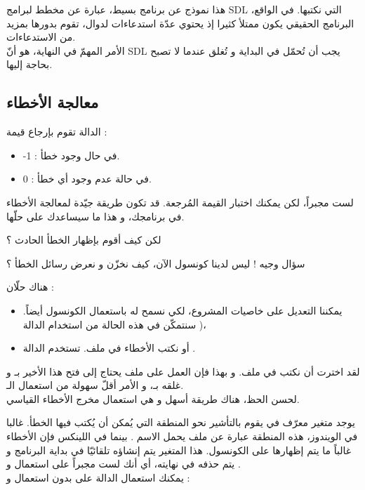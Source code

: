 هذا نموذج عن برنامج بسيط، عبارة عن مخطط لبرامج
\textenglish{SDL}
التي نكتبها. في الواقع، البرنامج الحقيقي يكون ممتلأ كثيرا إذ يحتوي عدّة استدعاءات لدوال، تقوم بدورها بمزيد من الاستدعاءات.\\
الأمر المهمّ في النهاية، هو أنّ
\textenglish{SDL}
يجب أن تُحمّل في البداية و تُغلق عندما لا تصبح بحاجة إليها.

\subsection{معالجة الأخطاء}

الدالة 
تقوم بإرجاع قيمة :

\begin{itemize}
	\item -1 : في حال وجود خطأ.
	\item 0 : في حالة عدم وجود أي خطأ.
\end{itemize}

لست مجبراً، لكن يمكنك اختبار القيمة المُرجعة. قد تكون طريقة جيّدة لمعالجة الأخطاء في برنامجك، و هذا ما سيساعدك على حلّها.

\begin{question}
لكن كيف أقوم بإظهار الخطأ الحادث ؟
\end{question}

سؤال وجيه ! ليس لدينا كونسول الآن، كيف نخزّن و نعرض رسائل الخطأ ؟

هناك حلّان :
\begin{itemize}
	\item يمكننا التعديل على خاصيات المشروع، لكي نسمح له باستعمال الكونسول أيضاً. سنتمكّن في هذه الحالة من استخدام الدالة 
	)،
	\item أو نكتب الأخطاء في ملف. تستخدم الدالة
	.
\end{itemize}

لقد اخترت أن نكتب في ملف. و بهذا فإن العمل على ملف يحتاج إلى فتح هذا الأخير بـ
و غلقه بـ،
و الأمر أقلّ سهولة من استعمال الـ.\\
لحسن الحظ، هناك طريقة أسهل و هي استعمال مخرج الأخطاء القياسي.

يوجد متغير 
معرّف في 
يقوم بالتأشير نحو المنطقة التي يُمكن أن يُكتب فيها الخطأ. غالبا في الويندوز، هذه المنطقة عبارة عن ملف يحمل الاسم 
.
بينما في اللينكس فإن الأخطاء غالباً ما يتم إظهارها على الكونسول. هذا المتغير يتم إنشاؤه تلقائيّا في بداية البرنامج و يتم حذفه في نهايته، أي أنك لست مجبراً على استعمال 
و
.\\
يمكنك استعمال الدالة
على 
بدون استعمال  
و 
 :

